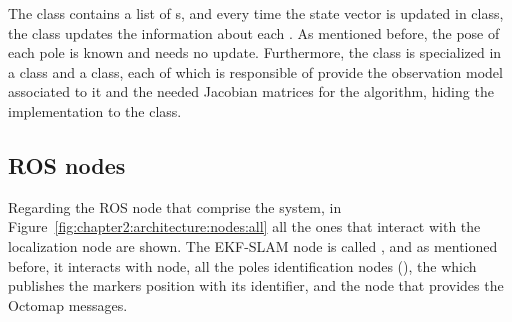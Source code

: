 The  class contains a list of s, and every time the state vector is updated in  class, the  class updates the information about each . As mentioned before, the pose of each pole is known and needs no update. Furthermore, the  class is specialized in a  class and a  class, each of which is responsible of provide the observation model associated to it and the needed Jacobian matrices for the algorithm, hiding the implementation to the  class.
\subsection{ROS nodes}
\label{subsec:chapter2:arch:nodes}
Regarding the ROS node that comprise the system, in Figure~\ref{fig:chapter2:architecture:nodes:all} all the ones that interact with the localization node are shown. The EKF-SLAM node is called , and as mentioned before, it interacts with  node, all the poles identification nodes (), the  which publishes the markers position with its identifier, and the  node that provides the Octomap messages. \\


